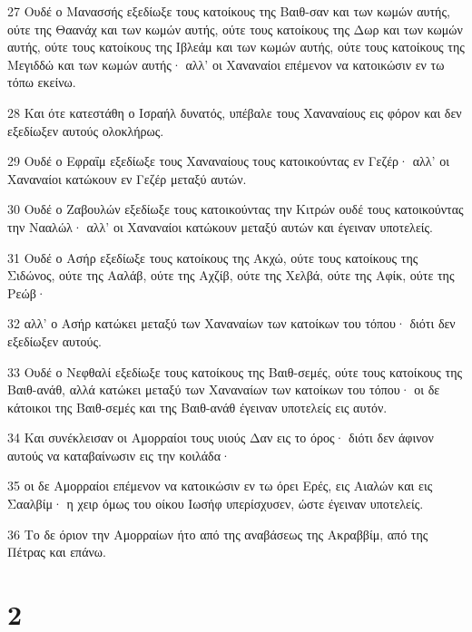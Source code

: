 \par 27 Ουδέ ο Μανασσής εξεδίωξε τους κατοίκους της Βαιθ-σαν και των κωμών αυτής, ούτε της Θαανάχ και των κωμών αυτής, ούτε τους κατοίκους της Δωρ και των κωμών αυτής, ούτε τους κατοίκους της Ιβλεάμ και των κωμών αυτής, ούτε τους κατοίκους της Μεγιδδώ και των κωμών αυτής· αλλ' οι Χαναναίοι επέμενον να κατοικώσιν εν τω τόπω εκείνω.
\par 28 Και ότε κατεστάθη ο Ισραήλ δυνατός, υπέβαλε τους Χαναναίους εις φόρον και δεν εξεδίωξεν αυτούς ολοκλήρως.
\par 29 Ουδέ ο Εφραΐμ εξεδίωξε τους Χαναναίους τους κατοικούντας εν Γεζέρ· αλλ' οι Χαναναίοι κατώκουν εν Γεζέρ μεταξύ αυτών.
\par 30 Ουδέ ο Ζαβουλών εξεδίωξε τους κατοικούντας την Κιτρών ουδέ τους κατοικούντας την Νααλώλ· αλλ' οι Χαναναίοι κατώκουν μεταξύ αυτών και έγειναν υποτελείς.
\par 31 Ουδέ ο Ασήρ εξεδίωξε τους κατοίκους της Ακχώ, ούτε τους κατοίκους της Σιδώνος, ούτε της Ααλάβ, ούτε της Αχζίβ, ούτε της Χελβά, ούτε της Αφίκ, ούτε της Ρεώβ·
\par 32 αλλ' ο Ασήρ κατώκει μεταξύ των Χαναναίων των κατοίκων του τόπου· διότι δεν εξεδίωξεν αυτούς.
\par 33 Ουδέ ο Νεφθαλί εξεδίωξε τους κατοίκους της Βαιθ-σεμές, ούτε τους κατοίκους της Βαιθ-ανάθ, αλλά κατώκει μεταξύ των Χαναναίων των κατοίκων του τόπου· οι δε κάτοικοι της Βαιθ-σεμές και της Βαιθ-ανάθ έγειναν υποτελείς εις αυτόν.
\par 34 Και συνέκλεισαν οι Αμορραίοι τους υιούς Δαν εις το όρος· διότι δεν άφινον αυτούς να καταβαίνωσιν εις την κοιλάδα·
\par 35 οι δε Αμορραίοι επέμενον να κατοικώσιν εν τω όρει Ερές, εις Αιαλών και εις Σααλβίμ· η χειρ όμως του οίκου Ιωσήφ υπερίσχυσεν, ώστε έγειναν υποτελείς.
\par 36 Το δε όριον την Αμορραίων ήτο από της αναβάσεως της Ακραββίμ, από της Πέτρας και επάνω.

\chapter{2}

